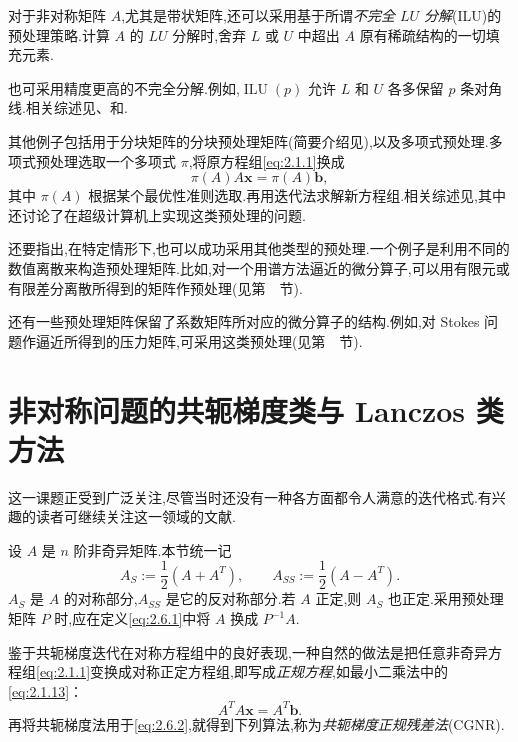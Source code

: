 对于非对称矩阵 \(A\),尤其是带状矩阵,还可以采用基于所谓\emph{不完全 \(LU\) 分解}(ILU)的预处理策略.计算 \(A\) 的 \(LU\) 分解时,舍弃 \(L\) 或 \(U\) 中超出 \(A\) 原有稀疏结构的一切填充元素.

也可采用精度更高的不完全分解.例如,\(\operatorname{ILU}(p)\) 允许 \(L\) 和 \(U\) 各多保留 \(p\) 条对角线.相关综述见、和.

其他例子包括用于分块矩阵的分块预处理矩阵(简要介绍见),以及多项式预处理.多项式预处理选取一个多项式 \(\pi\),将原方程组\eqref{eq:2.1.1}换成
\[
  \pi(A)A\boldsymbol{x}=\pi(A)\boldsymbol{b},
\]
其中 \(\pi(A)\) 根据某个最优性准则选取.再用迭代法求解新方程组.相关综述见,其中还讨论了在超级计算机上实现这类预处理的问题.

还要指出,在特定情形下,也可以成功采用其他类型的预处理.一个例子是利用不同的数值离散来构造预处理矩阵.比如,对一个用谱方法逼近的微分算子,可以用有限元或有限差分离散所得到的矩阵作预处理(见第~~节).

还有一些预处理矩阵保留了系数矩阵所对应的微分算子的结构.例如,对 Stokes 问题作逼近所得到的压力矩阵,可采用这类预处理(见第~~节).

\section{非对称问题的共轭梯度类与 Lanczos 类方法}\label{sec:2.6}

这一课题正受到广泛关注,尽管当时还没有一种各方面都令人满意的迭代格式.有兴趣的读者可继续关注这一领域的文献.

设 \(A\) 是 \(n\) 阶非奇异矩阵.本节统一记
\begin{equation}\label{eq:2.6.1}
  A_S:=\frac12(A+A^T),\qquad A_{SS}:=\frac12(A-A^T).
\end{equation}
\(A_S\) 是 \(A\) 的对称部分,\(A_{SS}\) 是它的反对称部分.若 \(A\) 正定,则 \(A_S\) 也正定.采用预处理矩阵 \(P\) 时,应在定义\eqref{eq:2.6.1}中将 \(A\) 换成 \(P^{-1}A\).

鉴于共轭梯度迭代在对称方程组中的良好表现,一种自然的做法是把任意非奇异方程组\eqref{eq:2.1.1}变换成对称正定方程组,即写成\emph{正规方程},如最小二乘法中的\eqref{eq:2.1.13}：
\begin{equation}\label{eq:2.6.2}
  A^TA\boldsymbol{x}=A^T\boldsymbol{b}.
\end{equation}
再将共轭梯度法用于\eqref{eq:2.6.2},就得到下列算法,称为\emph{共轭梯度正规残差法}(CGNR).


